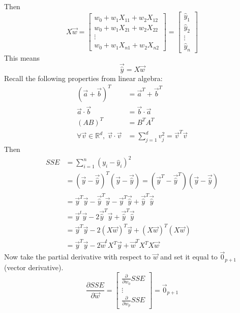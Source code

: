 \documentclass[12pt]{article}
\begin{document}
Then $$ X\vec{w} = \begin{bmatrix} w_0 + w_1X_{11} + w_2X_{12} \\ w_0 + w_1X_{21} + w_2X_{22} \\ \vdots \\ w_0 + w_1X_{n1} + w_2X_{n2} \end{bmatrix} = \begin{bmatrix} \hat{y}_1 \\ \hat{y}_2 \\ \vdots \\ \hat{y}_n \end{bmatrix} $$
 This means $$\vec{\hat{y}} = X\vec{w}$$
Recall the following properties from linear algebra:  $$ \begin{aligned} (\vec{a} + \vec{b})^T &= \vec{a}^T + \vec{b}^T \\ \vec{a} \cdot \vec{b} &= \vec{b} \cdot \vec{a} \\ (AB)^T &= B^TA^T \\ \forall \vec{v} \in \mathbb{R}^d, ~ \vec{v} \cdot \vec{v} &= \sum_{j=1}^d v_j^2 = \vec{v}^T\vec{v} \end{aligned} $$ Then $$ \begin{aligned} 
SSE &= \sum_{i=1}^n (y_i - \hat{y}_i)^2 \\ &= (\vec{y} - \vec{\hat{y}})^T(\vec{y} - \vec{\hat{y}}) = (\vec{y}^T - \vec{\hat{y}}^T)(\vec{y} - \vec{\hat{y}}) \\ &= \vec{y}^T\vec{y} - \vec{\hat{y}}^T\vec{y} - \vec{y}^T\vec{\hat{y}} + \vec{\hat{y}}^T\vec{\hat{y}} \\ &= \vec{y}^t\vec{y} - 2\vec{\hat{y}}^T\vec{y} + \vec{\hat{y}}^T\vec{\hat{y}} \\ &= \vec{y}^T\vec{y} - 2(X\vec{w})^T\vec{y} + (X\vec{w})^T(X\vec{w}) \\ &= \vec{y}^T\vec{y} - 2\vec{w}^tX^T\vec{y} + \vec{w}^TX^TX\vec{w} \end{aligned} $$ 
Now take the partial derivative with respect to $\vec{w}$ and set it equal to $\vec{0}_{p+1}$ (vector derivative). 
$$ \frac{\partial SSE}{\partial \vec{w}} = \begin{bmatrix} \frac{\partial}{\partial w_0} SSE \\ \vdots \\ \frac{\partial}{\partial w_p} SSE \end{bmatrix} = \vec{0}_{p+1} $$ 
\end{document}
